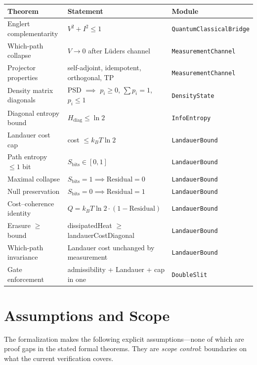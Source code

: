 \documentclass[11pt, a4paper]{article}
\begin{document}
\vspace{0.3em}
{\small
\begin{tabular}{@{}lll@{}}
\toprule
\textbf{Theorem} & \textbf{Statement} & \textbf{Module} \\
\midrule
Englert complementarity & $V^2 + I^2 \le 1$ & \texttt{QuantumClassicalBridge} \\
Which-path collapse & $V \to 0$ after L\"uders channel & \texttt{MeasurementChannel} \\
Projector properties & self-adjoint, idempotent, orthogonal, TP & \texttt{MeasurementChannel} \\
Density matrix diagonals & PSD $\implies$ $p_i \ge 0$, $\sum p_i = 1$, $p_i \le 1$ & \texttt{DensityState} \\
Diagonal entropy bound & $H_{\text{diag}} \le \ln 2$ & \texttt{InfoEntropy} \\
Landauer cost cap & cost $\le k_B T \ln 2$ & \texttt{LandauerBound} \\
Path entropy $\le 1$ bit & $S_{\text{bits}} \in [0, 1]$ & \texttt{LandauerBound} \\
Maximal collapse & $S_{\text{bits}} = 1 \implies \text{Residual} = 0$ & \texttt{LandauerBound} \\
Null preservation & $S_{\text{bits}} = 0 \implies \text{Residual} = 1$ & \texttt{LandauerBound} \\
Cost--coherence identity & $Q = k_B T \ln 2 \cdot (1 - \text{Residual})$ & \texttt{LandauerBound} \\
Erasure $\ge$ bound & dissipatedHeat $\ge$ landauerCostDiagonal & \texttt{LandauerBound} \\
Which-path invariance & Landauer cost unchanged by measurement & \texttt{LandauerBound} \\
Gate enforcement & admissibility + Landauer + cap in one & \texttt{DoubleSlit} \\
\bottomrule
\end{tabular}}

\section{Assumptions and Scope}

The formalization makes the following explicit assumptions---none of which are proof gaps in the stated formal theorems. They are \emph{scope control}: boundaries on what the current verification covers.
\end{document}
